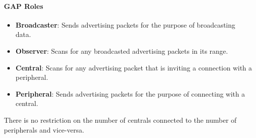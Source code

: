 \paragraph{GAP Roles}
\begin{itemize}
	\item \textbf{Broadcaster}: Sends advertising packets for the purpose of broadcasting data.
	\item \textbf{Observer}: Scans for any broadcasted advertising packets in its range.
	\item \textbf{Central}: Scans for any advertising packet that is inviting a connection with a peripheral.
	\item \textbf{Peripheral}: Sends advertising packets for the purpose of connecting with a central.
\end{itemize}
There is no restriction on the number of centrals connected to the number of peripherals and vice-versa. 
